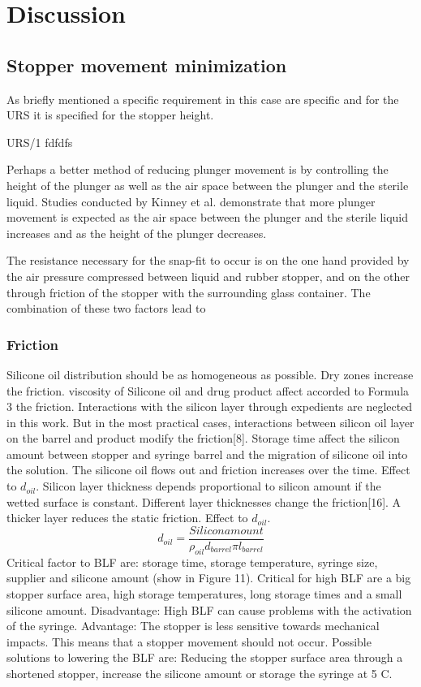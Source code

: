\newpage
\section{Discussion}
\subsection{Stopper movement minimization}
 
As briefly mentioned a specific requirement in this case are specific and for the URS it is specified for the stopper height.

URS/1 fdfdfs

Perhaps a better method of reducing plunger movement is by controlling the height of the plunger as well as the air space between the plunger and the sterile liquid. Studies conducted by Kinney et al. demonstrate that more plunger movement is expected as the air space between the plunger and the sterile liquid increases and as the height of the plunger decreases.

The resistance necessary for the snap-fit to occur is on the one hand provided by the air pressure compressed between liquid and rubber stopper, and on the other through friction of the stopper with the surrounding glass container. The combination of these two factors lead to

\subsubsection{Friction}
Silicone oil distribution should be as homogeneous as possible. Dry zones increase the friction. 	viscosity of Silicone oil and drug product  affect accorded to Formula 3 the friction. Interactions with the silicon layer through expedients are neglected in this work. But in the most practical cases, interactions between silicon oil layer on the barrel and product modify the friction[8]. Storage time affect the silicon amount between stopper and syringe barrel and the migration of silicone oil into the solution. The silicone oil flows out and friction increases over the time. Effect to $d_{oil}$. Silicon layer thickness depends proportional to silicon amount if the wetted surface is constant. Different layer thicknesses change the friction[16]. A thicker layer reduces the static friction. Effect to $d_{oil}$.
\begin{equation}
    d_{oil}=\frac{Silicon amount}{\rho_{oil} d_{barrel} \pi l_{barrel}}
    \end{equation}
Critical factor to BLF are: storage time, storage temperature, syringe size, supplier and silicone amount (show in Figure 11).
Critical for high BLF are a big stopper surface area, high storage temperatures, long storage times and a small silicone amount.
Disadvantage: High BLF can cause problems with the activation of the syringe.
Advantage: The stopper is less sensitive towards mechanical impacts. This means that a stopper movement should not occur.
Possible solutions to lowering the BLF are: Reducing the stopper surface area through a shortened stopper, increase the silicone amount or storage the syringe at 5 C.

